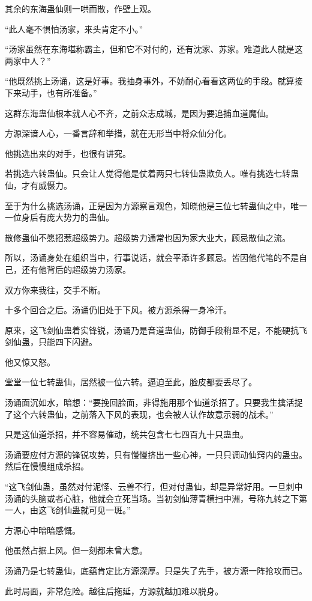 \begin{this_body}
其余的东海蛊仙则一哄而散，作壁上观。

“此人毫不惧怕汤家，来头肯定不小。”

“汤家虽然在东海堪称霸主，但和它不对付的，还有沈家、苏家。难道此人就是这两家中人？”

“他既然挑上汤诵，这是好事。我抽身事外，不妨耐心看看这两位的手段。就算接下来动手，也有所准备。”

这群东海蛊仙根本就人心不齐，之前众志成城，是因为要追捕血道魔仙。

方源深谙人心，一番言辞和举措，就在无形当中将众仙分化。

他挑选出来的对手，也很有讲究。

若挑选六转蛊仙。只会让人觉得他是仗着两只七转仙蛊欺负人。唯有挑选七转蛊仙，才有威慑力。

至于为什么挑选汤诵，正是因为方源察言观色，知晓他是三位七转蛊仙之中，唯一一位身后有庞大势力的蛊仙。

散修蛊仙不愿招惹超级势力。超级势力通常也因为家大业大，顾忌散仙之流。

所以，汤诵身处在组织当中，行事说话，就会平添许多顾忌。皆因他代笔的不是自己，还有他背后的超级势力汤家。

双方你来我往，交手不断。

十多个回合之后。汤诵仍旧处于下风。被方源杀得一身冷汗。

原来，这飞剑仙蛊着实锋锐，汤诵乃是音道蛊仙，防御手段稍显不足，不能硬抗飞剑仙蛊，只能四下闪避。

他又惊又怒。

堂堂一位七转蛊仙，居然被一位六转。逼迫至此，脸皮都要丢尽了。

汤诵面沉如水，暗想：“要挽回脸面，非得施用那个仙道杀招了。只要我生擒活捉了这个六转蛊仙，之前落入下风的表现，也会被人认作故意示弱的战术。”

只是这仙道杀招，并不容易催动，统共包含七七四百九十只蛊虫。

汤诵要应付方源的锋锐攻势，只有慢慢挤出一些心神，一只只调动仙窍内的蛊虫。然后在慢慢组成杀招。

“这飞剑仙蛊，虽然对付泥怪、云兽不行，但对付蛊仙，却是异常好用。一旦刺中汤诵的头脑或者心脏，他就会立死当场。当初剑仙薄青横扫中洲，号称九转之下第一人，由这飞剑仙蛊就可见一斑。”

方源心中暗暗感慨。

他虽然占据上风。但一刻都未曾大意。

汤诵乃是七转蛊仙，底蕴肯定比方源深厚。只是失了先手，被方源一阵抢攻而已。

此时局面，非常危险。越往后拖延，方源就越加难以脱身。


\end{this_body}

